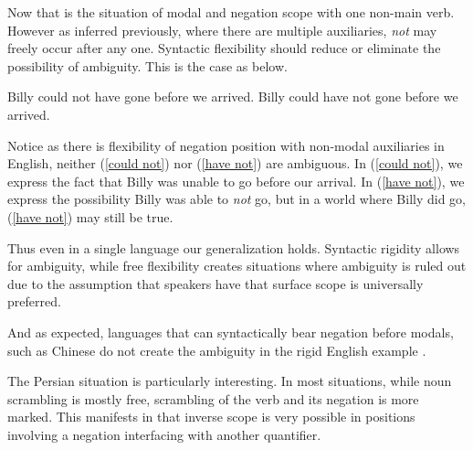 \documentclass{article}
\begin{document}
Now that is the situation of modal and negation scope with one non-main verb. However as inferred previously, where there are multiple auxiliaries, \emph{not} may freely occur after any one. Syntactic flexibility should reduce or eliminate the possibility of ambiguity. This is the case as below.

\begin{exe}
\ex Billy could not have gone before we arrived.\label{could not}
\ex Billy could have not gone before we arrived.\label{have not}
\end{exe}

Notice as there is flexibility of negation position with non-modal auxiliaries in English, neither (\ref{could not}) nor (\ref{have not}) are ambiguous. In (\ref{could not}), we express the fact that Billy was unable to go before our arrival. In (\ref{have not}), we express the possibility Billy was able to \emph{not} go, but in a world where Billy did go, (\ref{have not}) may still be true.

Thus even in a single language our generalization holds. Syntactic rigidity allows for ambiguity, while free flexibility creates situations where ambiguity is ruled out due to the assumption that speakers have that surface scope is universally preferred.

And as expected, languages that can syntactically bear negation before modals, such as Chinese do not create the ambiguity in the rigid English example \parencite{ernst98}.

\begin{exe}
\end{exe}

The Persian situation is particularly interesting. In most situations, while noun scrambling is mostly free, scrambling of the verb and its negation is more marked. This manifests in that inverse scope is very possible in positions involving a negation interfacing with another quantifier.

\begin{exe}
\end{exe}
\end{document}

